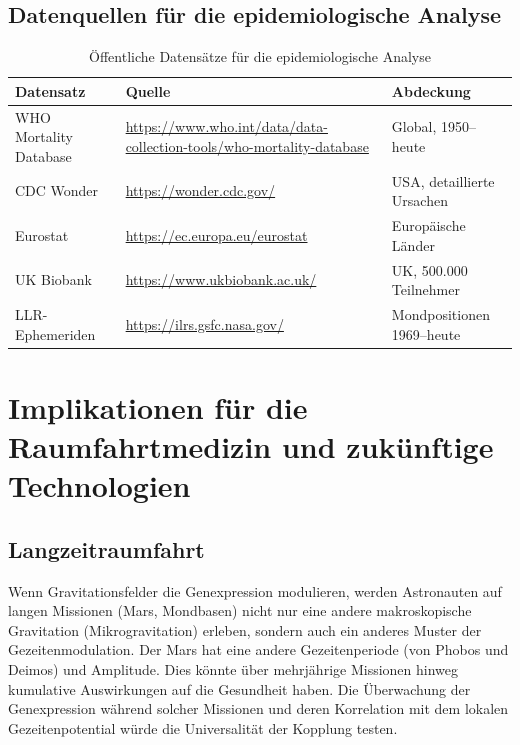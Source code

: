 \documentclass[12pt,a4paper]{article}
\theoremstyle{remark}
\begin{document}
	\subsection{Datenquellen für die epidemiologische Analyse}
	
	\begin{table}[htbp]
		\centering
		\caption{Öffentliche Datensätze für die epidemiologische Analyse}
		\label{tab:data-sources}
		\small
		\begin{tabular}{p{3.2cm}p{6.5cm}p{2.8cm}}
			\toprule
			\textbf{Datensatz} & \textbf{Quelle} & \textbf{Abdeckung} \\
			\midrule
			WHO Mortality Database & 
			\url{https://www.who.int/data/data-collection-tools/who-mortality-database} & 
			Global, 1950–heute \\
			CDC Wonder & 
			\url{https://wonder.cdc.gov/} & 
			USA, detaillierte Ursachen \\
			Eurostat & 
			\url{https://ec.europa.eu/eurostat} & 
			Europäische Länder \\
			UK Biobank & 
			\url{https://www.ukbiobank.ac.uk/} & 
			UK, 500.000 Teilnehmer \\
			LLR-Ephemeriden & 
			\url{https://ilrs.gsfc.nasa.gov/} & 
			Mondpositionen 1969–heute \\
			\bottomrule
		\end{tabular}
	\end{table}
	
	\section{Implikationen für die Raumfahrtmedizin und zukünftige Technologien}
	\label{sec:applications}
	
	\subsection{Langzeitraumfahrt}
	
	Wenn Gravitationsfelder die Genexpression modulieren, werden Astronauten auf langen Missionen (Mars, Mondbasen) nicht nur eine andere makroskopische Gravitation (Mikrogravitation) erleben, sondern auch ein anderes Muster der Gezeitenmodulation. Der Mars hat eine andere Gezeitenperiode (von Phobos und Deimos) und Amplitude. Dies könnte über mehrjährige Missionen hinweg kumulative Auswirkungen auf die Gesundheit haben. Die Überwachung der Genexpression während solcher Missionen und deren Korrelation mit dem lokalen Gezeitenpotential würde die Universalität der Kopplung testen.
	
\end{document}
